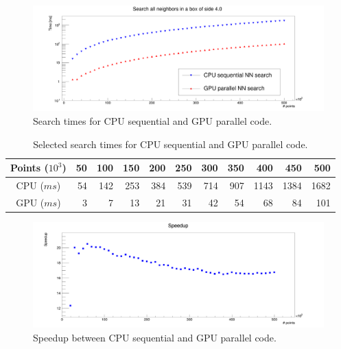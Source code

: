 \begin{figure}
\includegraphics[width=\textwidth]{fkdtree/fkdSearchTimes.png}
\caption{Search times for CPU sequential and GPU parallel code.}
\label{fkdtree_search_times}
\end{figure}

\begin{center}
\begin{table}[h]
\begin{tabular}{ c || r r r r r r r r r r }
Points ($10^{3}$) & 50 & 100 & 150 & 200 & 250 & 300 & 350 & 400 & 450 & 500 \\
\hline
CPU ($\unit{ms}$) & 54 & 142 & 253 & 384 & 539 & 714 & 907 & 1143 & 1384 & 1682 \\
GPU ($\unit{ms}$) & 3 & 7 & 13 & 21 & 31 & 42 & 54 & 68 & 84 & 101 \\
\end{tabular}
\caption{Selected search times for CPU sequential and GPU parallel code.}
\label{fkdtree_times_tab}
\end{table}
\end{center}

\begin{figure}
\includegraphics[width=\textwidth]{fkdtree/fkdSpeedup.png}
\caption{Speedup between CPU sequential and GPU parallel code.}
\label{fkdtree_speedup}
\end{figure}
\newpage

